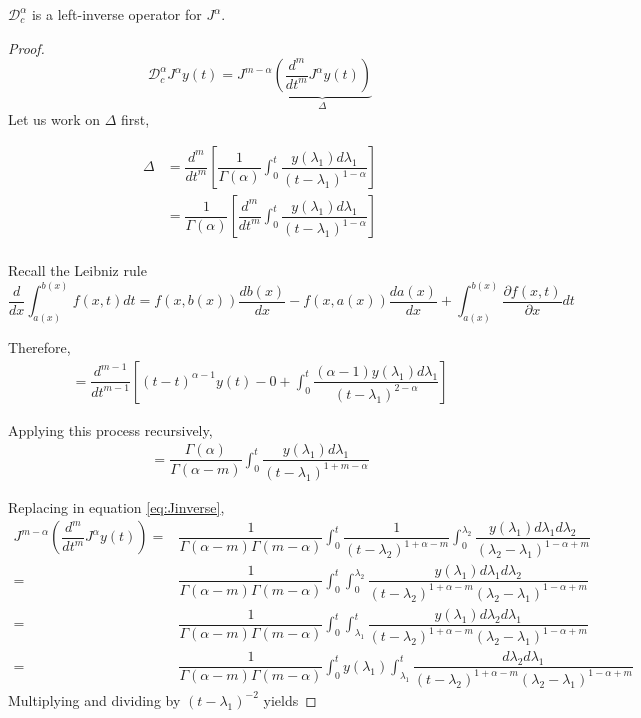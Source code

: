    \begin{theorem}\label{theo:leftinverse}
        $\mathcal{D}_c^\alpha$ is a left-inverse operator for $J^\alpha$.
    \end{theorem}
    \begin{proof}
        \begin{equation}
    \mathcal{D}_c^\alpha J^\alpha y(t) = J^{m-\alpha}\underset{\Delta}{\underbrace{\left(\dfrac{d^m}{dt^m}J^\alpha y(t)\right)}}
\end{equation}\label{eq:Jinverse}
Let us work on $\Delta$ first,

\begin{align*}
    \Delta&=\dfrac{d^m}{dt^m}\left[\dfrac{1}{\Gamma(\alpha)}\int_0^t\dfrac{y(\lambda_1)d\lambda_1}{(t-\lambda_1)^{1-\alpha}}\right]\\
    &= \dfrac{1}{\Gamma(\alpha)}\left[\dfrac{d^m}{dt^m}\int_0^t\dfrac{y(\lambda_1)d\lambda_1}{(t-\lambda_1)^{1-\alpha}}\right]\\
\end{align*}

Recall the Leibniz rule
\begin{equation}
    \dfrac{d}{dx}\int_{a(x)}^{b(x)}f(x,t)dt = f(x,b(x))\dfrac{db(x)}{dx}-f(x,a(x))\dfrac{da(x)}{dx}+\int_{a(x)}^{b(x)}\dfrac{\partial f(x,t)}{\partial x}dt
\end{equation}

Therefore,
\begin{align*}
    =\dfrac{d^{m-1}}{dt^{m-1}}\left[(t-t)^{\alpha-1}y(t) - 0 + \int_{0}^t \dfrac{(\alpha-1)y(\lambda_1)d\lambda_1}{(t-\lambda_1)^{2-\alpha}}\right]
\end{align*}

Applying this process recursively,
\begin{align*}
    =\dfrac{\Gamma(\alpha)}{\Gamma(\alpha-m)}\int_0^t\dfrac{y(\lambda_1)d\lambda_1}{(t-\lambda_1)^{1+m-\alpha}}
\end{align*}

Replacing in equation \eqref{eq:Jinverse},
\begin{align*}
    J^{m-\alpha}\left(\dfrac{d^m}{dt^m}J^\alpha y(t)\right)=&\dfrac{1}{\Gamma(\alpha-m)\Gamma{(m-\alpha)}}\int_0^t \dfrac{1}{(t-\lambda_2)^{1+\alpha-m}}\int_0^{\lambda_2} \dfrac{y(\lambda_1)d\lambda_1d\lambda_2}{(\lambda_2-\lambda_1)^{1-\alpha+m}}\\
    =& \dfrac{1}{\Gamma(\alpha-m)\Gamma{(m-\alpha)}}\int_0^t\int_0^{\lambda_2}  \dfrac{y(\lambda_1)d\lambda_1d\lambda_2}{(t-\lambda_2)^{1+\alpha-m}(\lambda_2-\lambda_1)^{1-\alpha+m}}\\
    =& \dfrac{1}{\Gamma(\alpha-m)\Gamma{(m-\alpha)}}\int_0^t\int_{\lambda_1}^{t}
    \dfrac{y(\lambda_1)d\lambda_2d\lambda_1}{(t-\lambda_2)^{1+\alpha-m}(\lambda_2-\lambda_1)^{1-\alpha+m}}\\
    =& \dfrac{1}{\Gamma(\alpha-m)\Gamma{(m-\alpha)}}\int_0^ty(\lambda_1)\int_{\lambda_1}^{t}
    \dfrac{d\lambda_2d\lambda_1}{(t-\lambda_2)^{1+\alpha-m}(\lambda_2-\lambda_1)^{1-\alpha+m}}
\end{align*}
Multiplying and dividing by $(t-\lambda_1)^{-2}$ yields


\end{proof}
